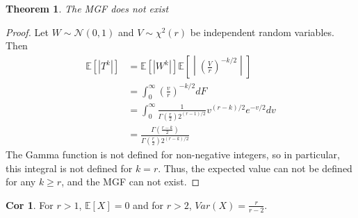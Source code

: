 \documentclass{article}
\newtheorem{theorem}{Theorem}
\theoremstyle{definition}\newtheorem{definition}{DEF}
\theoremstyle{definition}\newtheorem{example}{Ex}
\theoremstyle{lemma}\newtheorem{lemma}{Lemma}
\theoremstyle{corrolary}\newtheorem{corrolary}{Cor}
\begin{document}
\begin{theorem}
The MGF does not exist
\end{theorem}
\begin{proof}
Let $W\sim \mathcal{N}(0,1)$ and $V\sim \chi^2(r)$ be independent random variables.
Then
\begin{align*}
\mathbb{E}[|T^k|]&=\mathbb{E}[|W^k|]\mathbb{E}\left[ \middle|\left( \frac{V}{r}\right)^{-k/2}\middle| \right]\\
&=\int_0^\infty \left( \frac{v}{r}\right)^{-k/2} dF\\
&=\int_0^\infty \frac{1}{\Gamma \left( \frac{r}{2} \right) 2^{(r-1)/2}}v^{(r-k)/2} e^{-v/2}dv\\
&=\frac{\Gamma \left(\frac{r-k}{2}\right)}{\Gamma \left( \frac{r}{2}\right) 2^{(r-k)/2}}
\end{align*}
The Gamma function is not defined for non-negative integers, so in particular, this integral is not defined for $k=r$.
Thus, the expected value can not be defined for any $k\geq r$, and the MGF can not exist.
\end{proof}
\begin{corrolary}
For $r>1$, $\mathbb{E}[X]=0$ and for $r>2$, $Var(X)=\frac{r}{r-2}$.
\end{corrolary}
\end{document}
